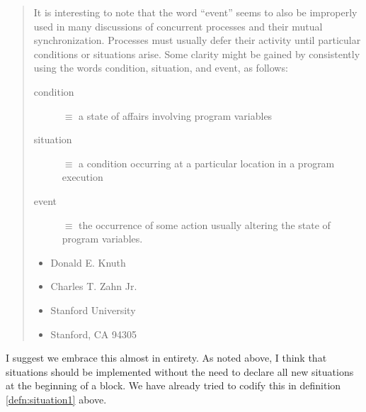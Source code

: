 \documentclass[10pt]{amsart}
\begin{document}
\begin{quotation}
\begin{offside}
It is interesting to note that the word ``event'' seems to also be
improperly used in many discussions of concurrent processes and their
mutual synchronization. Processes must usually defer their activity
until particular conditions or situations arise.  Some clarity might
be gained by consistently using the words condition, situation, and
event, as follows:
\vspace{1ex}%
\renewcommand{\descriptionlabel}[1]{%
  \hspace*{-0.5\labelsep}#1\strut\hspace{-\labelsep}\strut}
\begin{description}
\item[condition]\strut{} $\equiv$ a state of affairs involving program variables
\item[situation]\strut{} $\equiv$ a condition occurring at a particular
  location in a program execution
\item[event]\strut{} $\equiv$ the occurrence of some action usually altering
  the state of program variables.
\end{description}
\vspace{1ex}%
\begin{itemize}
\item[\strut]Donald E. Knuth
\item[\strut]Charles T. Zahn Jr.
\item[\strut]Stanford University
\item[\strut]Stanford, CA 94305
\end{itemize}
\end{offside}
\end{quotation}
I suggest we embrace this almost in entirety.  As noted above, I think
that situations should be implemented without the need to declare all
new situations at the beginning of a block.  We have already tried to
codify this in definition \ref{defn:situation1} above.
\end{document}
